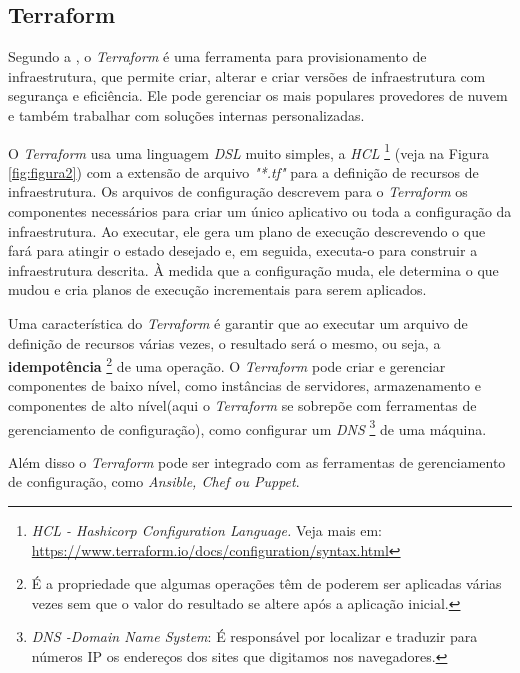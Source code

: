 \vspace{-0.5cm}

\subsection{Terraform} \label{terraform} 

 Segundo a , o \textit{Terraform} é uma ferramenta para provisionamento de infraestrutura, que permite criar, alterar e criar versões de infraestrutura com segurança e eficiência. Ele pode gerenciar os mais populares provedores de nuvem e também trabalhar com soluções internas personalizadas.

O \textit{Terraform} usa uma linguagem \textit{DSL} muito simples, a \textit{HCL} \footnote{\textit{HCL - Hashicorp Configuration Language.} Veja mais em: \href{https://www.terraform.io/docs/configuration/syntax.html}{https://www.terraform.io/docs/configuration/syntax.html} } (veja na Figura \ref{fig:figura2}) com a extensão de arquivo \textit{"*.tf"} para a definição de recursos de infraestrutura. Os arquivos de configuração descrevem para o \textit{Terraform} os componentes necessários para criar um único aplicativo ou toda a configuração da infraestrutura. Ao executar, ele gera um plano de execução descrevendo o que fará para atingir o estado desejado e, em seguida, executa-o para construir a infraestrutura descrita. 
À medida que a configuração muda, ele determina o que mudou e cria planos de execução incrementais para serem aplicados.

Uma característica do \textit{Terraform} é garantir que ao executar um arquivo de definição de recursos várias vezes, o resultado será o mesmo, ou seja, a \textbf{idempotência} \footnote{É a propriedade que algumas operações têm de poderem ser aplicadas várias vezes sem que o valor do resultado se altere após a aplicação inicial.} de uma operação. O \textit{Terraform} pode criar e gerenciar componentes de baixo nível, como instâncias de servidores, armazenamento e componentes de alto nível(aqui o \textit{Terraform} se sobrepõe com ferramentas de gerenciamento de configuração), como configurar um \textit{DNS} \footnote{\textit{DNS -Domain Name System}: É responsável por localizar e traduzir para números IP os endereços dos sites que digitamos nos navegadores.} de uma máquina.

Além disso o \textit{Terraform} pode ser integrado com as ferramentas de gerenciamento de configuração, como \textit{Ansible, Chef ou Puppet}.

